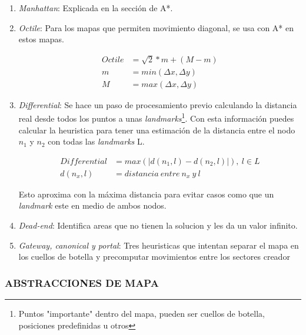 \begin{enumerate}

\item \textit{Manhattan}: Explicada en la sección de A*. 

\item \textit{Octile}: Para los mapas que permiten movimiento diagonal, se usa con A* en estos mapas.

\begin{align*}
	Octile &= \sqrt{2}*m + (M-m) \\
	m &= min( \Delta x, \Delta y) \\
	M &= max( \Delta x, \Delta y)
\end{align*}

\item \textit{Differential}: \cite{goldberg2005computing}
 Se hace un paso de procesamiento previo calculando la distancia real desde todos los puntos a unas \textit{landmarks}\footnote{Puntos "importante" dentro del mapa, pueden ser cuellos de botella, posiciones predefinidas u otros}. Con esta información puedes calcular la heuristica para tener una estimación de la distancia entre el nodo $n_1$ y $n_2$ con todas las \textit{landmarks} L.

\begin{align*}
	Differential &= max(| d(n_1,l) - d(n_2,l) |),  \ l \in L \\
	d(n_x,l) &= distancia\ entre\ n_x\ y\ l
\end{align*}

Esto aproxima con la máxima distancia para evitar casos como que un \textit{landmark} este en medio de ambos nodos.

\item \textit{Dead-end}: \cite{bjornsson2006improved} Identifica areas que no tienen la solucion y les da un valor infinito. 
	
\item \textit{Gateway, canonical y portal}: \cite{bjornsson2006improved,sturtevant2009memory,goldenberg2010portal} Tres heuristicas que intentan separar el mapa en los cuellos de botella y precomputar movimientos entre los sectores creador

\end{enumerate}


\subsubsection{ABSTRACCIONES DE MAPA}







